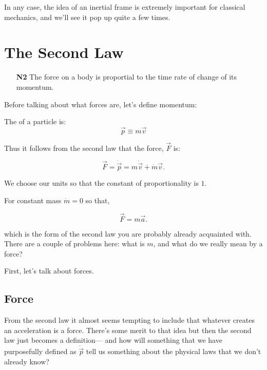 In any case, the idea of an inertial frame is extremely important for classical mechanics, and we'll see 
it pop up quite a few times.

\section{The Second Law}

\begin{enumerate}
    \item[\textbf{N2}] The force on a body is proportial to the time rate of change of its momentum.
\end{enumerate}

Before talking about what forces are, let's define momentum:

\begin{definition}
    The  of a particle is:
    \begin{equation}
        \vec{p} \equiv m\vec{v}
    \end{equation}
\end{definition}

Thus it follows from the second law that the force, $\vec{F}$ is:

\begin{equation}
    \vec{F} = \dot{\vec{p}} = m\dot{\vec{v}} + \dot{m}\vec{v}.
\end{equation}

We choose our units so that the constant of proportionality is $1$.

For constant mass $\dot{m} = 0$ so that,

\begin{equation}
    \vec{F} = m\vec{a}.
\end{equation}

which is the form of the second law you are probably already acquainted with. There are a couple of problems 
here: what is $m$, and what do we really mean by a force?

First, let's talk about forces.

\subsection{Force}   

From the second law it almost seems tempting to include that whatever creates an acceleration is a force. 
There's some merit to that idea but then the second law just becomes a definition--- and how will something 
that we have purposefully defined as $\dot{\vec{p}}$ tell us something about the physical laws that we don't already know?


